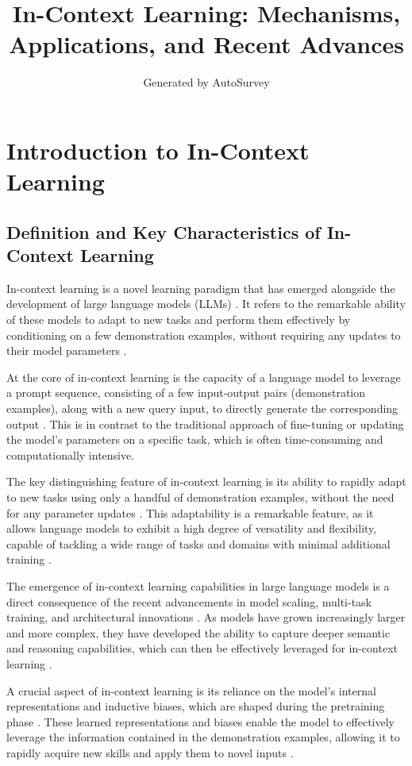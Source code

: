 \documentclass[11pt]{article}
\title{In-Context Learning: Mechanisms, Applications, and Recent Advances}
\author{Generated by AutoSurvey}
\date{}
\begin{document}
\maketitle
\tableofcontents
\newpage

\section{Introduction to In-Context Learning}

\subsection{Definition and Key Characteristics of In-Context Learning}

In-context learning is a novel learning paradigm that has emerged alongside the development of large language models (LLMs) \cite{ref1,ref2}. It refers to the remarkable ability of these models to adapt to new tasks and perform them effectively by conditioning on a few demonstration examples, without requiring any updates to their model parameters \cite{ref3}.

At the core of in-context learning is the capacity of a language model to leverage a prompt sequence, consisting of a few input-output pairs (demonstration examples), along with a new query input, to directly generate the corresponding output \cite{ref4}. This is in contrast to the traditional approach of fine-tuning or updating the model's parameters on a specific task, which is often time-consuming and computationally intensive.

The key distinguishing feature of in-context learning is its ability to rapidly adapt to new tasks using only a handful of demonstration examples, without the need for any parameter updates \cite{ref5}. This adaptability is a remarkable feature, as it allows language models to exhibit a high degree of versatility and flexibility, capable of tackling a wide range of tasks and domains with minimal additional training \cite{ref6}.

The emergence of in-context learning capabilities in large language models is a direct consequence of the recent advancements in model scaling, multi-task training, and architectural innovations \cite{ref7}. As models have grown increasingly larger and more complex, they have developed the ability to capture deeper semantic and reasoning capabilities, which can then be effectively leveraged for in-context learning \cite{ref3}.

A crucial aspect of in-context learning is its reliance on the model's internal representations and inductive biases, which are shaped during the pretraining phase \cite{ref2}. These learned representations and biases enable the model to effectively leverage the information contained in the demonstration examples, allowing it to rapidly acquire new skills and apply them to novel inputs \cite{ref8}.
\end{document}
